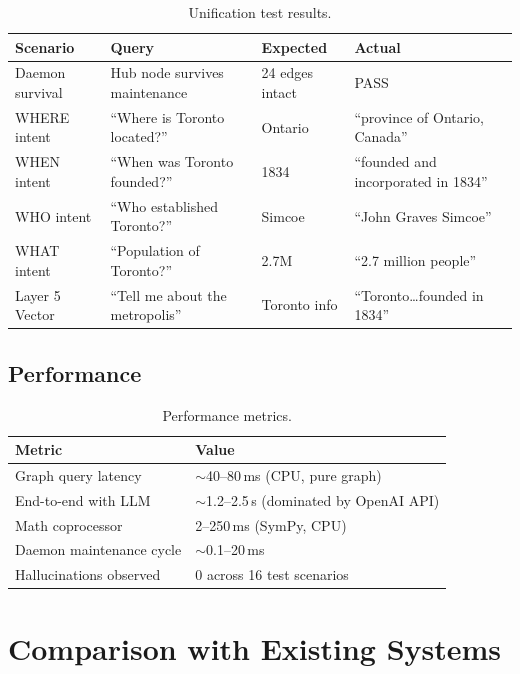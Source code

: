 \documentclass[11pt,a4paper]{article}
\begin{document}
\begin{table}[ht]
\centering
\caption{Unification test results.}
\label{tab:unification}
\begin{tabular}{@{}llll@{}}
\toprule
\textbf{Scenario} & \textbf{Query} & \textbf{Expected} & \textbf{Actual} \\
\midrule
Daemon survival & Hub node survives maintenance     & 24 edges intact                & PASS \\
WHERE intent    & ``Where is Toronto located?''      & Ontario                        & ``province of Ontario, Canada'' \\
WHEN intent     & ``When was Toronto founded?''      & 1834                           & ``founded and incorporated in 1834'' \\
WHO intent      & ``Who established Toronto?''       & Simcoe                         & ``John Graves Simcoe'' \\
WHAT intent     & ``Population of Toronto?''         & 2.7M                           & ``2.7 million people'' \\
Layer 5 Vector  & ``Tell me about the metropolis''   & Toronto info                   & ``Toronto\ldots founded in 1834'' \\
\bottomrule
\end{tabular}
\end{table}

\subsection{Performance}

\begin{table}[ht]
\centering
\caption{Performance metrics.}
\label{tab:perf}
\begin{tabular}{@{}ll@{}}
\toprule
\textbf{Metric} & \textbf{Value} \\
\midrule
Graph query latency       & $\sim$40--80\,ms (CPU, pure graph) \\
End-to-end with LLM       & $\sim$1.2--2.5\,s (dominated by OpenAI API) \\
Math coprocessor           & 2--250\,ms (SymPy, CPU) \\
Daemon maintenance cycle   & $\sim$0.1--20\,ms \\
Hallucinations observed    & 0 across 16 test scenarios \\
\bottomrule
\end{tabular}
\end{table}

\section{Comparison with Existing Systems}
\end{document}
